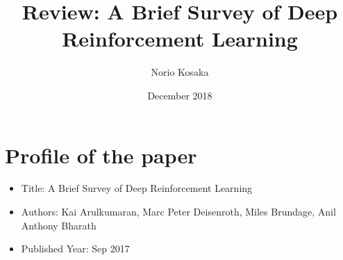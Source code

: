 \documentclass{article}
\title{Review: A Brief Survey of Deep Reinforcement Learning}
\author{Norio Kosaka}
\date{December 2018}
\begin{document}
\maketitle

\section{Profile of the paper}
\begin{itemize}
    \item Title: A Brief Survey of Deep Reinforcement Learning
    \item Authors: Kai Arulkumaran, Marc Peter Deisenroth, Miles Brundage, Anil Anthony Bharath
    \item Published Year: Sep 2017
\end{itemize}
\end{document}
